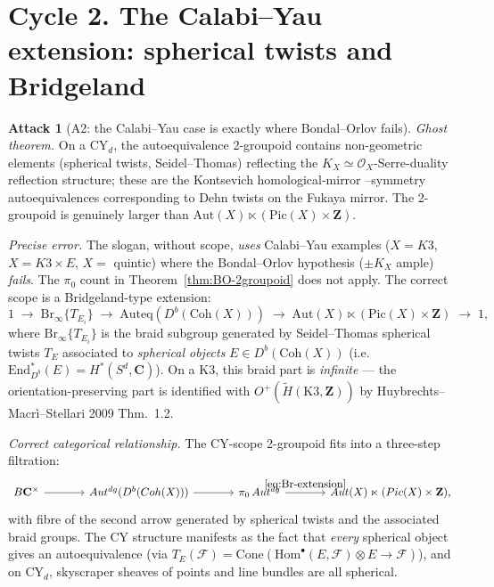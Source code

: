 \documentclass[11pt]{amsart}
\theoremstyle{definition}
\newtheorem{attack}{Attack}
\providecommand{\Coh}{\mathrm{Coh}}
\providecommand{\Aut}{\mathrm{Aut}}
\providecommand{\Auteq}{\mathrm{Auteq}}
\providecommand{\Autdg}{\mathrm{Aut}^{\rm dg}}
\providecommand{\Pic}{\mathrm{Pic}}
\providecommand{\End}{\mathrm{End}}
\providecommand{\cO}{\mathcal{O}}
\providecommand{\cF}{\mathcal{F}}
\providecommand{\bC}{\mathbf{C}}
\providecommand{\bZ}{\mathbf{Z}}
\begin{document}
\section{Cycle 2. The Calabi--Yau extension: spherical twists and
Bridgeland}
\label{sec:cycle-CY}

\begin{attack}[A2: the Calabi--Yau case is exactly where Bondal--Orlov fails]
\leavevmode

\noindent\emph{Ghost theorem.} On a CY$_d$, the autoequivalence
2-groupoid contains non-geometric elements (spherical twists,
Seidel--Thomas) reflecting the $K_X \simeq \cO_X$-Serre-duality
reflection structure; these are the Kontsevich homological-mirror
--symmetry autoequivalences corresponding to Dehn twists on the
Fukaya mirror. The 2-groupoid is genuinely larger than
$\Aut(X) \ltimes (\Pic(X) \times \bZ)$.

\noindent\emph{Precise error.} The slogan, without scope, \emph{uses}
Calabi--Yau examples ($X = K3$, $X = K3 \times E$, $X = $ quintic)
where the Bondal--Orlov hypothesis ($\pm K_X$ ample) \emph{fails}. The
$\pi_0$ count in Theorem~\ref{thm:BO-2groupoid} does not apply. The
correct scope is a Bridgeland-type extension:
\begin{equation}\label{eq:Br-extension}
 1 \;\to\; \mathrm{Br}_\infty\bigl\{T_{E_i}\bigr\} \;\to\;
 \Auteq(D^b(\Coh(X))) \;\to\;
 \Aut(X) \ltimes (\Pic(X) \times \bZ) \;\to\; 1,
\end{equation}
where $\mathrm{Br}_\infty\{T_{E_i}\}$ is the braid subgroup generated
by Seidel--Thomas spherical twists $T_{E}$ associated to
\emph{spherical objects} $E \in D^b(\Coh(X))$ (i.e.\ $\End^*_{D^b}(E)
= H^*(S^d, \bC)$). On a K3, this braid part is \emph{infinite} --- the
orientation-preserving part is identified with
$O^+(\widetilde{H}(\mathrm{K3}, \bZ))$ by Huybrechts--Macr\`i--Stellari
2009 Thm.~1.2.

\noindent\emph{Correct categorical relationship.} The CY-scope
2-groupoid fits into a three-step filtration:
\[
\begin{tikzcd}[column sep=large]
 B\bC^\times \ar[r] & \Autdg(D^b(\Coh(X)))
 \ar[r] & \pi_0\,\Autdg \ar[r, "\eqref{eq:Br-extension}"] &
 \Aut(X) \ltimes (\Pic(X) \times \bZ),
\end{tikzcd}
\]
with fibre of the second arrow generated by spherical twists and the
associated braid groups. The CY structure manifests as the fact that
\emph{every} spherical object gives an autoequivalence (via
$T_E(\cF) = \mathrm{Cone}(\mathrm{Hom}^\bullet(E, \cF) \otimes E \to \cF)$),
and on CY$_d$, skyscraper sheaves of points and line bundles
are all spherical.
\end{attack}
\end{document}
